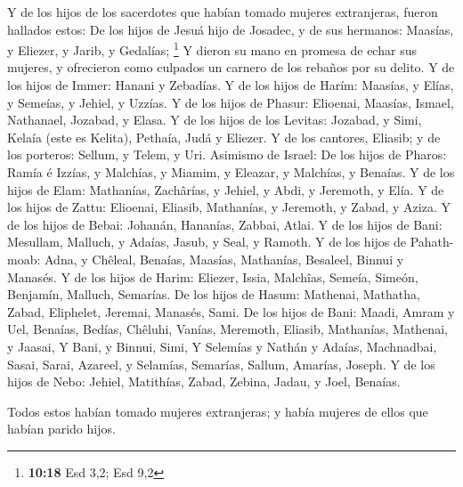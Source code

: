  Y de los hijos de los sacerdotes que habían tomado
mujeres extranjeras, fueron hallados estos: De los hijos de Jesuá hijo
de Josadec, y de sus hermanos: Maasías, y Eliezer, y Jarib, y Gedalías;
\footnote{\textbf{10:18} Esd 3,2; Esd 9,2}  Y dieron su
mano en promesa de echar sus mujeres, y ofrecieron como culpados un
carnero de los rebaños por su delito.  Y de los hijos de
Immer: Hanani y Zebadías.  Y de los hijos de Harím:
Maasías, y Elías, y Semeías, y Jehiel, y Uzzías.  Y de
los hijos de Phasur: Elioenai, Maasías, Ismael, Nathanael, Jozabad, y
Elasa.  Y de los hijos de los Levitas: Jozabad, y Simi,
Kelaía (este es Kelita), Pethaía, Judá y Eliezer.  Y de
los cantores, Eliasib; y de los porteros: Sellum, y Telem, y Uri.
 Asimismo de Israel: De los hijos de Pharos: Ramía é
Izzías, y Malchías, y Miamim, y Eleazar, y Malchías, y Benaías.
 Y de los hijos de Elam: Mathanías, Zachârías, y Jehiel,
y Abdi, y Jeremoth, y Elía.  Y de los hijos de Zattu:
Elioenai, Eliasib, Mathanías, y Jeremoth, y Zabad, y Aziza.
 Y de los hijos de Bebai: Johanán, Hananías, Zabbai,
Atlai.  Y de los hijos de Bani: Mesullam, Malluch, y
Adaías, Jasub, y Seal, y Ramoth.  Y de los hijos de
Pahath-moab: Adna, y Chêleal, Benaías, Maasías, Mathanías, Besaleel,
Binnui y Manasés.  Y de los hijos de Harim: Eliezer,
Issia, Malchîas, Semeía, Simeón,  Benjamín, Malluch,
Semarías.  De los hijos de Hasum: Mathenai, Mathatha,
Zabad, Eliphelet, Jeremai, Manasés, Sami.  De los hijos
de Bani: Maadi, Amram y Uel,  Benaías, Bedías, Chêluhi,
 Vanías, Meremoth, Eliasib,  Mathanías,
Mathenai, y Jaasai,  Y Bani, y Binnui, Simi,
 Y Selemías y Nathán y Adaías, 
Machnadbai, Sasai, Sarai,  Azareel, y Selamías, Semarías,
 Sallum, Amarías, Joseph.  Y de los hijos
de Nebo: Jehiel, Matithías, Zabad, Zebina, Jadau, y Joel, Benaías.

 Todos estos habían tomado mujeres extranjeras; y había
mujeres de ellos que habían parido hijos.
